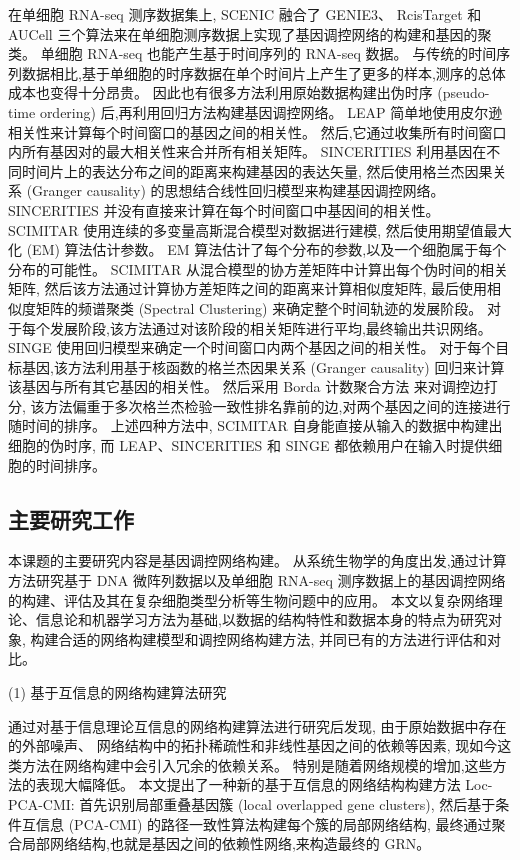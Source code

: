 在单细胞 RNA-seq 测序数据集上, 
SCENIC \cite{aibar2017scenic} 融合了 GENIE3、 RcisTarget 和 AUCell 三个算法来在单细胞测序数据上实现了基因调控网络的构建和基因的聚类。
单细胞 RNA-seq 也能产生基于时间序列的 RNA-seq 数据。
与传统的时间序列数据相比,基于单细胞的时序数据在单个时间片上产生了更多的样本,测序的总体成本也变得十分昂贵。
因此也有很多方法利用原始数据构建出伪时序 (pseudo-time ordering) 后,再利用回归方法构建基因调控网络。
LEAP \cite{specht2017leap} 简单地使用皮尔逊相关性来计算每个时间窗口的基因之间的相关性。 
然后,它通过收集所有时间窗口内所有基因对的最大相关性来合并所有相关矩阵。
SINCERITIES \cite{papili2017sincerities} 利用基因在不同时间片上的表达分布之间的距离来构建基因的表达矢量,
然后使用格兰杰因果关系 (Granger causality) 的思想结合线性回归模型来构建基因调控网络。
SINCERITIES 并没有直接来计算在每个时间窗口中基因间的相关性。
SCIMITAR \cite{cordero2017tracing} 使用连续的多变量高斯混合模型对数据进行建模,
然后使用期望值最大化 (EM) 算法估计参数。
EM 算法估计了每个分布的参数,以及一个细胞属于每个分布的可能性。
SCIMITAR 从混合模型的协方差矩阵中计算出每个伪时间的相关矩阵,
然后该方法通过计算协方差矩阵之间的距离来计算相似度矩阵,
最后使用相似度矩阵的频谱聚类 (Spectral Clustering) 来确定整个时间轨迹的发展阶段。
对于每个发展阶段,该方法通过对该阶段的相关矩阵进行平均,最终输出共识网络。
SINGE \cite{deshpande2019network} 使用回归模型来确定一个时间窗口内两个基因之间的相关性。
对于每个目标基因,该方法利用基于核函数的格兰杰因果关系 (Granger causality) 回归来计算该基因与所有其它基因的相关性。
然后采用 Borda 计数聚合方法 \cite{van2000variants} 来对调控边打分,
该方法偏重于多次格兰杰检验一致性排名靠前的边,对两个基因之间的连接进行随时间的排序。
上述四种方法中, SCIMITAR 自身能直接从输入的数据中构建出细胞的伪时序, 
而 LEAP、SINCERITIES 和 SINGE 都依赖用户在输入时提供细胞的时间排序。

\subsection{主要研究工作}
本课题的主要研究内容是基因调控网络构建。
从系统生物学的角度出发,通过计算方法研究基于 DNA 微阵列数据以及单细胞 RNA-seq 测序数据上的基因调控网络的构建、评估及其在复杂细胞类型分析等生物问题中的应用。
本文以复杂网络理论、信息论和机器学习方法为基础,以数据的结构特性和数据本身的特点为研究对象,
构建合适的网络构建模型和调控网络构建方法,
并同已有的方法进行评估和对比。

(1) 基于互信息的网络构建算法研究

通过对基于信息理论互信息的网络构建算法进行研究后发现,
由于原始数据中存在的外部噪声、
网络结构中的拓扑稀疏性和非线性基因之间的依赖等因素,
现如今这类方法在网络构建中会引入冗余的依赖关系。
特别是随着网络规模的增加,这些方法的表现大幅降低。
本文提出了一种新的基于互信息的网络结构构建方法 Loc-PCA-CMI:
首先识别局部重叠基因簇 (local overlapped gene clusters),
然后基于条件互信息 (PCA-CMI) 的路径一致性算法构建每个簇的局部网络结构,
最终通过聚合局部网络结构,也就是基因之间的依赖性网络,来构造最终的 GRN。

